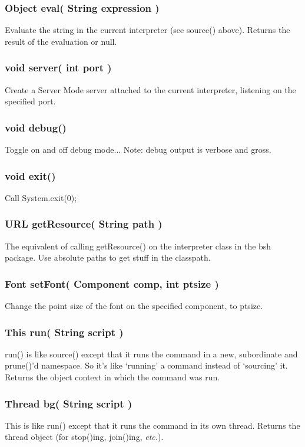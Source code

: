 \documentclass[twoside,11pt]{article}
\renewcommand{\_}{\texttt{\symbol{95}}}
\newcommand{\etc}{\textit{etc.}}
\begin{document}
\subsubsection*{Object eval( String expression )}
Evaluate the string in the current interpreter (see source() above).
Returns the result of the evaluation or null.

\subsubsection*{void server( int port )}
Create a Server Mode server attached to the current interpreter,
listening on the specified port.

\subsubsection*{void debug()}
Toggle on and off debug mode... Note: debug output is verbose and gross.

\subsubsection*{void exit()}
Call System.exit(0);

\subsubsection*{URL getResource( String path )}
The equivalent of calling getResource() on the interpreter class in
the bsh package.  Use absolute paths to get stuff in the classpath.

\subsubsection*{Font setFont( Component comp, int ptsize )}
Change the point size of the font on the specified component, to ptsize.

\subsubsection*{This run( String script )}
run() is like source() except that it runs the command in a new,
subordinate and prune()'d namespace.  So it's like `running' a command
instead of `sourcing' it.  Returns the object context in which the command
was run.

\subsubsection*{Thread bg( String script )}
This is like run() except that it runs the command in its own thread.
Returns the thread object (for stop()ing, join()ing, \etc).
\end{document}

